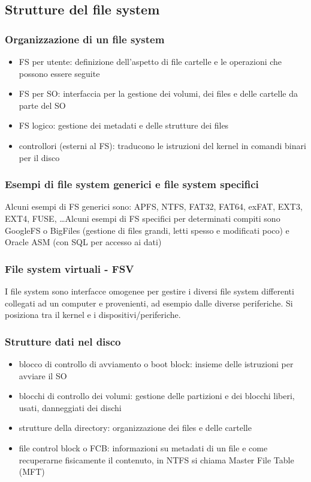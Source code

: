 \documentclass[a4paper]{article}
\begin{document}
\subsection{Strutture del file system}
\subsubsection*{Organizzazione di un file system}
\begin{itemize}
	\item FS per utente: definizione dell'aspetto di file cartelle e le operazioni che possono essere seguite
	\item FS per SO: interfaccia per la gestione dei volumi, dei files e delle cartelle da parte del SO
	\item FS logico: gestione dei metadati e delle strutture dei files
	\item controllori (esterni al FS): traducono le istruzioni del kernel in comandi binari per il disco
\end{itemize}

\subsubsection*{Esempi di file system generici e file system specifici}
Alcuni esempi di FS generici sono: APFS, NTFS, FAT32, FAT64, exFAT, EXT3, EXT4, FUSE, \dots Alcuni esempi di FS specifici per
determinati compiti sono GoogleFS o BigFiles (gestione di files grandi, letti spesso e modificati poco) e Oracle ASM (con
SQL per accesso ai dati)

\subsubsection*{File system virtuali - FSV}
I file system sono interfacce omogenee per gestire i diversi file system differenti collegati ad un computer e provenienti, ad
esempio dalle diverse periferiche. Si posiziona tra il kernel e i dispositivi/periferiche.

\subsubsection*{Strutture dati nel disco}
\begin{itemize}
	\item blocco di controllo di avviamento o boot block: insieme delle istruzioni per avviare il SO
	\item blocchi di controllo dei volumi: gestione delle partizioni e dei blocchi liberi, usati, danneggiati dei dischi
	\item strutture della directory: organizzazione dei files e delle cartelle
	\item file control block o FCB: informazioni su metadati di un file e come recuperarne fisicamente il contenuto, in NTFS si 
	chiama Master File Table (MFT)
\end{itemize}
\end{document}
